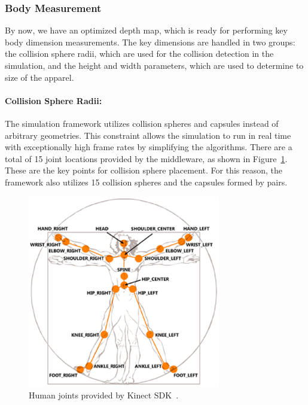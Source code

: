 \documentclass[number,preprint,review,12pt]{elsarticle}
\begin{document}
\doublespacing

\subsubsection{Body Measurement}
\label{subsubsec:4.2} 

By now, we have an optimized depth map, which is ready for performing key body dimension measurements. The key dimensions are handled in two groups:
 the collision sphere radii, which are used for the collision detection in the simulation, and the height and width parameters, which are used to determine to size of the apparel. 

\paragraph{Collision Sphere Radii:}

The simulation framework utilizes collision spheres and capsules instead of arbitrary geometries. This constraint allows the simulation to run in real time with exceptionally high frame rates by simplifying the algorithms. There are a total of 15 joint locations provided by the middleware, as shown in Figure~\ref{fig:nite_joints}. These are the key points for collision sphere placement. For this reason, the framework also utilizes 15 collision spheres and the capsules formed by pairs.

\begin{figure}[htbp]
	\begin{center}
	\includegraphics[width=0.75\textwidth]{./figures/nite_joints.eps}
	\end{center}
	\caption{Human joints provided by Kinect SDK~\cite{CodeProject2011}.}
	\label{fig:nite_joints}
\end{figure}
\end{document}

